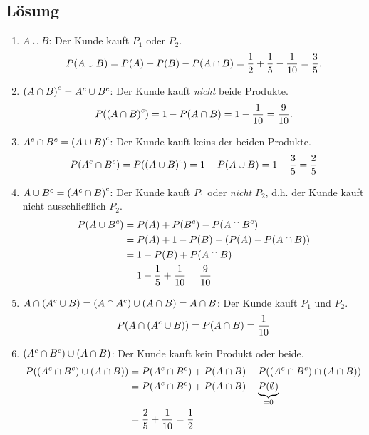\documentclass{exercise}
\begin{document}
    \subsection*{Lösung}
    \begin{enumerate}
        \item \(A \cup B\): Der Kunde kauft \(P_1\) oder \(P_2\).
        \[
            P\parentheses*{A \cup B} = P\parentheses*{A} + P\parentheses*{B} - P\parentheses*{A \cap B} = \frac{1}{2} + \frac{1}{5} - \frac{1}{10} = \frac{3}{5}.
        \]
        \item \(\parentheses*{A \cap B}^c = A^c \cup B^c\): Der Kunde kauft \emph{nicht} beide Produkte.
        \[
            P\parentheses*{\parentheses*{A \cap B}^c} = 1 - P\parentheses*{A \cap B} = 1 - \frac{1}{10} = \frac{9}{10}.
        \]
        \item \(A^c \cap B^c = \parentheses*{A \cup B}^c\): Der Kunde kauft keins der beiden Produkte.
        \[
            P\parentheses*{A^c \cap B^c} = P\parentheses*{\parentheses*{A \cup B}^c} = 1 - P\parentheses*{A \cup B} = 1 - \frac{3}{5} = \frac{2}{5}
        \]
        \item \(A \cup B^c = \parentheses*{A^c \cap B}^c\): Der Kunde kauft \(P_1\) oder \emph{nicht} \(P_2\), d.h. der Kunde kauft nicht ausschließlich \(P_2\).
        \begin{align*}
            P\parentheses*{A \cup B^c} &= P\parentheses*{A} + P\parentheses*{B^c} - P\parentheses*{A \cap B^c}\\
            &= P\parentheses*{A} + 1 - P\parentheses*{B} - \parentheses*{P\parentheses*{A} - P\parentheses*{A \cap B}}\\
            &= 1 - P\parentheses*{B} + P\parentheses*{A \cap B}\\
            &= 1 - \frac{1}{5} + \frac{1}{10} = \frac{9}{10}
        \end{align*}
        \item \(A \cap \parentheses*{A^c \cup B} = \parentheses*{A \cap A^c} \cup \parentheses*{A \cap B} = A \cap B\): Der Kunde kauft \(P_1\) und \(P_2\).
        \[
            P\parentheses*{A \cap \parentheses*{A^c \cup B}} = P\parentheses*{A \cap B} = \frac{1}{10}
        \]
        \item \(\parentheses*{A^c \cap B^c} \cup \parentheses*{A \cap B}\): Der Kunde kauft kein Produkt oder beide.
        \begin{align*}
            P\parentheses*{\parentheses*{A^c \cap B^c} \cup \parentheses*{A \cap B}} &= P\parentheses*{A^c \cap B^c} + P\parentheses*{A \cap B} - P\parentheses*{\parentheses*{A^c \cap B^c} \cap \parentheses*{A \cap B}}\\
            &= P\parentheses*{A^c \cap B^c} + P\parentheses*{A \cap B} - \underbrace{P\parentheses*{\emptyset}}_{= 0}\\
            &= \frac{2}{5} + \frac{1}{10} = \frac{1}{2}
        \end{align*}
    \end{enumerate}
\end{document}
